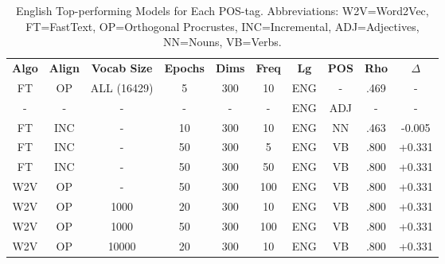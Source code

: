 \begin{table}[h]
\centering
\begin{tabular}{cccccccccc} 
\toprule
\textbf{ Algo } & \textbf{ Align } & \textbf{ Vocab Size } & \textbf{ Epochs } & \textbf{ Dims } & \textbf{ Freq} & \textbf{ Lg } & \textbf{ POS } & \textbf{ Rho } & \textbf{ $\Delta$ }  \\
FT              & OP               & ALL (16429)           & 5                 & 300             & 10             & ENG           & -              & .469           & -               \\
-               & -                & -                     & -                 & -               & -              & ENG           & ADJ            & -              & -               \\
FT              & INC              & -                     & 10                & 300             & 10             & ENG           & NN             & .463           & -0.005            \\
FT              & INC              & -                     & 50                & 300             & 5              & ENG           & VB             & .800           & +0.331            \\
FT              & INC              & -                     & 50                & 300             & 50             & ENG           & VB             & .800           & +0.331            \\
W2V             & OP               & -                     & 50                & 300             & 100            & ENG           & VB             & .800           & +0.331            \\
W2V             & OP               & 1000                  & 20                & 300             & 10             & ENG           & VB             & .800           & +0.331            \\
W2V             & OP               & 1000                  & 50                & 300             & 100            & ENG           & VB             & .800           & +0.331            \\
W2V             & OP               & 10000                 & 20                & 300             & 10             & ENG           & VB             & .800           & +0.331            \\
\bottomrule
\end{tabular}
\caption{English Top-performing Models for Each POS-tag. Abbreviations: W2V=Word2Vec, FT=FastText, OP=Orthogonal Procrustes, INC=Incremental, ADJ=Adjectives, NN=Nouns, VB=Verbs.}
\label{tab:eng-posresults}
\end{table}


